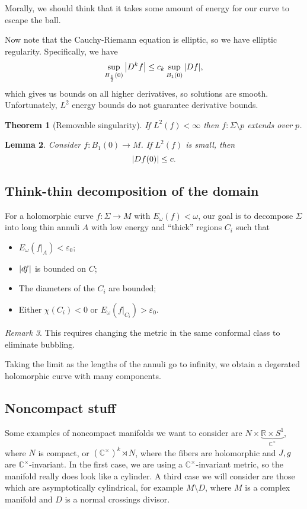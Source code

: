 \documentclass[leqno, openany]{memoir}
\newtheorem{thm}{Theorem}[section]
\newtheorem{lem}[thm]{Lemma}
\theoremstyle{definition}
\theoremstyle{remark}
\newtheorem{rmk}[thm]{Remark}
\theoremstyle{plain}
\theoremstyle{definition}
\theoremstyle{remark}
\newcommand{\R}{\mathbb{R}}
\newcommand{\C}{\mathbb{C}}
\newcommand{\ep}{\varepsilon}
\begin{document}
Morally, we should think that it takes some amount of energy for our curve to escape the ball.

Now note that the Cauchy-Riemann equation is elliptic, so we have elliptic regularity. Specifically, we have
\[ \sup_{B_{\frac{1}{2}}(0)} \abs{D^k f} \leq c_k \sup_{B_1(0)} \abs{Df}, \]
which gives us bounds on all higher derivatives, so solutions are smooth. Unfortunately, $L^2$ energy bounds do not guarantee derivative bounds.

\begin{thm}[Removable singularity]
    If $L^2(f) < \infty$ then $f \colon \Sigma \setminus p$ extends over $p$.
\end{thm}

\begin{lem}
    Consider $f \colon B_1(0) \to M$. If $L^2(f)$ is small, then
    \[ \abs{Df(0)} \leq c. \]
\end{lem}

\subsection{Think-thin decomposition of the domain}

For a holomorphic curve $f \colon \Sigma \to M$ with $E_{\omega}(f) < \omega$, our goal is to decompose $\Sigma$ into long thin annuli $A$ with low energy and ``thick'' regions $C_i$ such that
\begin{itemize}
    \item $E_{\omega}(f|_A) < \ep_0$;
    \item $\abs{df}$ is bounded on $C$;
    \item The diameters of the $C_i$ are bounded;
    \item Either $\chi(C_i) < 0$ or $E_{\omega}(f|_{C_i}) > \ep_0$.
\end{itemize}

\begin{rmk}
    This requires changing the metric in the same conformal class to eliminate bubbling.
\end{rmk}

Taking the limit as the lengths of the annuli go to infinity, we obtain a degerated holomorphic curve with many components.

\subsection{Noncompact stuff}

Some examples of noncompact manifolds we want to consider are $N \times \underbrace{\R \times S^1}_{\C^{\times}}$, where $N$ is compact, or $(\C^{\times})^k \rtimes N$, where the fibers are holomorphic and $J, g$ are $\C^{\times}$-invariant. In the first case, we are using a $\C^{\times}$-invariant metric, so the manifold really does look like a cylinder. A third case we will consider are those which are asymptotically cylindrical, for example $M \setminus D$, where $M$ is a complex manifold and $D$ is a normal crossings divisor.
\end{document}
